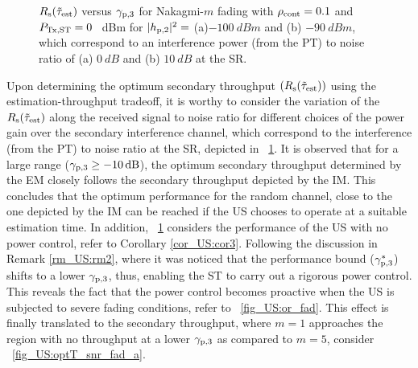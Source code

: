 \begin{figure}[!ht]
{
\label{fig_US:optT_snr_fad_b}
}
\vspace{-2mm}
\caption{$R_{\text{s}}(\tilde{\tau}_{\text{est}})$ versus ${\gamma}_{\text{p,3}}$ for Nakagmi-$m$ fading with $\rho_{\text{cont}} = 0.1$ and $P_{\text{Tx,ST}} = 0$ \SI{}{dBm} for $|h_{\text{p,2}}|^2 =$ (a)$\SI{-100}{dBm}$ and (b) $ \SI{-90}{dBm}$, which correspond to an interference power (from the PT) to noise ratio of (a) $\SI{0}{dB}$ and (b) $\SI{10}{dB}$ at the SR.}
\label{fig_US:optT_snr_fad}
\end{figure}

Upon determining the optimum secondary throughput $(R_{\text{s}}(\tilde{\tau}_{\text{est}}))$ using the estimation-throughput tradeoff, it is worthy to consider the variation of the $R_{\text{s}}(\tilde{\tau}_{\text{est}})$ along the received signal to noise ratio for different choices of the power gain over the secondary interference channel, which correspond to the interference (from the PT) to noise ratio at the SR, depicted in \figurename~\ref{fig_US:optT_snr_fad}. It is observed that for a large range (${\gamma}_{\text{p,3}} \ge \SI{-10}{dB}$), the optimum secondary throughput determined by the EM closely follows the secondary throughput depicted by the IM. This concludes that the optimum performance for the random channel, close to the one depicted by the IM can be reached if the US chooses to operate at a suitable estimation time. In addition, \figurename~\ref{fig_US:optT_snr_fad} considers the performance of the US with no power control, refer to Corollary \ref{cor_US:cor3}. Following the discussion in Remark \ref{rm_US:rm2}, where it was noticed that the performance bound (${\gamma}_{\text{p,3}}^*$) shifts to a lower ${\gamma}_{\text{p,3}}$, thus, enabling the ST to carry out a rigorous power control. This reveals the fact that the power control becomes proactive when the US is subjected to severe fading conditions, refer to \figurename~\ref{fig_US:or_fad}. This effect is finally translated to the secondary throughput, where $m = 1$ approaches the region with no throughput at a lower ${\gamma}_{\text{p,3}}$ as compared to $m = 5$, consider \figurename~\ref{fig_US:optT_snr_fad_a}. 
